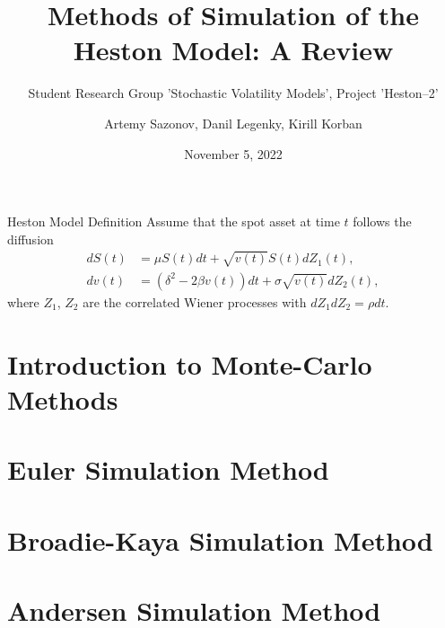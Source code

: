 \documentclass{vegapresentation}
\subtitle{Student Research Group 'Stochastic Volatility Models', Project 'Heston--2'}
\title{Methods of Simulation of the Heston Model: A Review}
\author{Artemy Sazonov, Danil Legenky, Kirill Korban}
\institute{Lomonosov Moscow State Univesity, Faculty of Mechanics and Mathematics}
\date{November 5, 2022}
\begin{document}
    \maketitle

    \begin{frame}{Heston Model Definition}
        Assume that the spot asset at time $t$ follows the diffusion
        \begin{align}
            dS(t) & = \mu S(t)dt + \sqrt{v(t)} S(t) dZ_1(t), \label{Heston:price}\\
            dv(t) & = \left(\delta^2 - 2\beta v(t)\right) dt + \sigma\sqrt{v(t)} dZ_2(t), \label{Heston:variance}
        \end{align}
        where $Z_1$, $Z_2$ are the correlated Wiener processes with $dZ_1dZ_2 = \rho dt$.
    \end{frame}

    \section{Introduction to Monte-Carlo Methods}
        

    \section{Euler Simulation Method}
        

    \section{Broadie-Kaya Simulation Method} 
        

    \section{Andersen Simulation Method}
        


    
\end{document}
